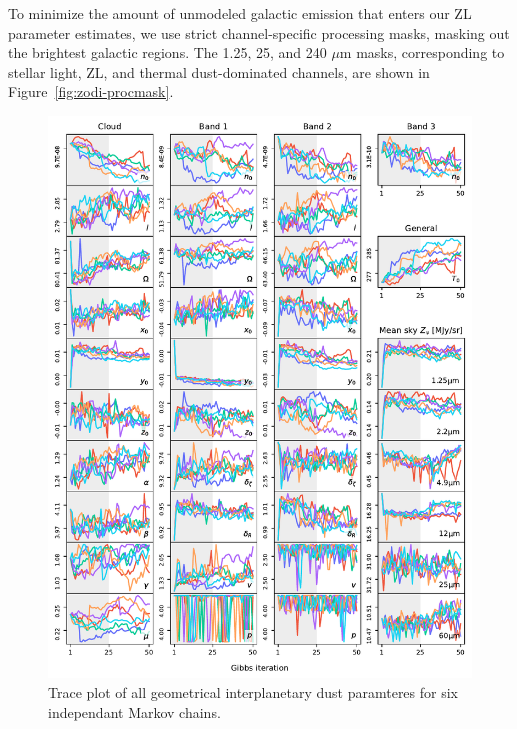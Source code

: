 \documentclass[twocolumn]{aa}
\begin{document}
To minimize the amount of unmodeled galactic emission that enters our 
ZL parameter estimates, we use strict channel-specific processing masks, 
masking out the brightest galactic regions. The 1.25, 25, and 240 $\mu$m 
masks, corresponding to stellar light, ZL, and thermal dust-dominated 
channels, are shown in Figure~\ref{fig:zodi-procmask}.


\begin{figure}
    \centering
    \includegraphics[width=1\textwidth]{figs/total_trace.pdf}
    \caption{Trace plot of all geometrical interplanetary dust paramteres for six independant Markov chains.}
    \label{fig:trace-ipd}
\end{figure}
\end{document}
